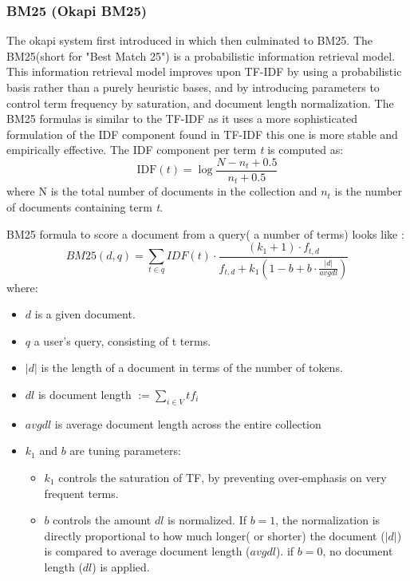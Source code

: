 \subsubsection{BM25 (Okapi BM25)}
The okapi system first introduced in\cite{Bm25foundation} which then culminated to BM25. The BM25(short for "Best Match 25") is a probabilistic information retrieval model. This information retrieval model improves upon TF-IDF by using a probabilistic basis rather than a purely heuristic bases, and by introducing parameters to control term frequency by saturation, and document length normalization.
The BM25 formulas is similar to the TF-IDF as it uses a more sophisticated formulation of the IDF component found in TF-IDF this one is more stable and empirically effective. The IDF component per term \textit{t} is computed as:
\begin{equation}
    \label{eq:idfbm25}
    \text{IDF}(t) = \log \frac{N-n_t+0.5}{n_t+0.5}
\end{equation}
where N is the total number of documents in the collection and $n_t$ is the number of documents containing term \textit{t}.

BM25 formula to score a document from a query( a number of terms) looks like \cite{bm25}:
\begin{equation}
    \label{eq:bm25}
    \textit{BM25}(d,q) = \sum_{t \in q} IDF(t) \cdot \frac{(k_1+1)\cdot f_{t,d}}{f_{t,d}+k_1(1-b+b \cdot \frac{|d|}{avgdl})}
\end{equation}
where:
\begin{itemize}
\item $d$ is a given document.
\item $q$ a user's query, consisting of t terms.
\item $|d|$ is the length of a document in terms of the number of tokens.
\item $dl$ is document length $:=\sum_{i \in V}{tf}_i$
\item $avgdl$ is average document length across the entire collection
\item $k_1$ and $b$ are tuning parameters:
\begin{itemize}
    \item $k_1$ controls  the saturation of \ac{TF}, by preventing over-emphasis on very frequent terms.
    \item $b$ controls the amount $dl$ is normalized. If $b = 1$, the normalization is directly proportional to how much longer( or shorter) the document ($|d|$) is compared to average document length ($avgdl$). if $b=0$, no document length ($dl$) is applied.
\end{itemize}
\end{itemize}


